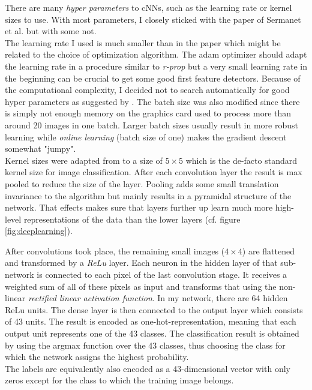 \documentclass[11pt,a4paper]{article}
\begin{document}
There are many \textit{hyper parameters} to cNNs, such as the learning rate or kernel sizes to use. With most parameters, I closely sticked with the paper of Sermanet et al. \cite{sermanet2011traffic} but with some not.\\
The learning rate I used is much smaller than in the paper which might be related to the choice of optimization algorithm. The adam optimizer should adapt the learning rate in a procedure similar to \textit{r-prop} but a very small learning rate in the beginning can be crucial to get some good first feature detectors. Because of the computational complexity, I decided not to search automatically for good hyper parameters as suggested by . The batch size was also modified since there is simply not enough memory on the graphics card used to process more than around 20 images in one batch. Larger batch sizes usually result in more robust learning while \textit{online learning} (batch size of one) makes the gradient descent somewhat "jumpy".\\
Kernel sizes were adapted from \cite{cnnOriginal} to a size of $5 \times 5$ which is the de-facto standard kernel size for image classification. After each convolution layer the result is max pooled to reduce the size of the layer. Pooling adds some small translation invariance to the algorithm but mainly results in a pyramidal structure of the network. That effects makes sure that layers further up learn much more high-level representations of the data than the lower layers (cf. figure \ref{fig:deeplearning}).

After convolutions took place, the remaining small images ($4 \times 4$) are flattened and transformed by a \textit{ReLu} layer. Each neuron in the hidden layer of that sub-network is connected to each pixel of the last convolution stage. It receives a weighted sum of all of these pixels as input and transforms that using the non-linear \textit{rectified linear activation function}. In my network, there are 64 hidden ReLu units.
The dense layer is then connected to the output layer which consists of 43 units. The result is encoded as one-hot-representation, meaning that each output unit represents one of the 43 classes. The classification result is obtained by using the argmax function over the 43 classes, thus choosing the class for which the network assigns the highest probability.\\
The labels are equivalently also encoded as a 43-dimensional vector with only zeros except for the class to which the training image belongs.
\end{document}

